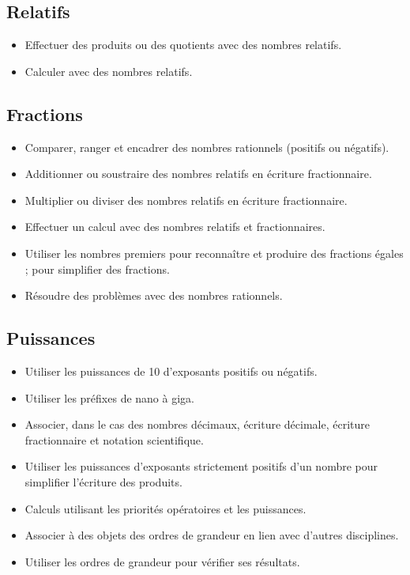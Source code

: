 \documentclass[a4paper,12pt,fleqn]{article}	
\begin{document}
\renewcommand{\labelitemi}{}

\subsection*{Relatifs}

\begin{itemize}
	\item {}Effectuer des produits ou des quotients avec des nombres relatifs.
	\item {}Calculer avec des nombres relatifs.
\end{itemize}

\subsection*{Fractions}

\begin{itemize}
	\item {}Comparer, ranger et encadrer des nombres rationnels (positifs ou négatifs).
	\item {}Additionner ou soustraire des nombres relatifs en écriture fractionnaire.
	\item {}Multiplier ou diviser des nombres relatifs en écriture fractionnaire.
	\item {}Effectuer un calcul avec des nombres relatifs et fractionnaires.
	\item {}Utiliser les nombres premiers pour reconnaître et produire des fractions égales ; pour simplifier des fractions.
	\item {}Résoudre des problèmes avec des nombres rationnels.
\end{itemize}

\subsection*{Puissances}

\begin{itemize}
	\item {}Utiliser les puissances de 10 d’exposants positifs ou négatifs.
	\item {}Utiliser les préfixes de nano à giga.
	\item {}Associer, dans le cas des nombres décimaux, écriture décimale, écriture fractionnaire et notation scientifique.
	\item {}Utiliser les puissances d’exposants strictement positifs d’un nombre pour simplifier l’écriture des produits.
	\item {}Calculs utilisant les priorités opératoires et les puissances.
	\item {}Associer à des objets des ordres de grandeur en lien avec d’autres disciplines.
	\item {}Utiliser les ordres de grandeur pour vérifier ses résultats.
\end{itemize}
\end{document}
